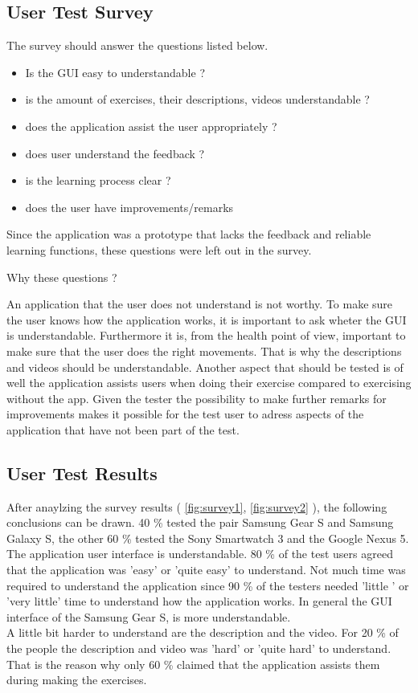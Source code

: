 \subsection{User Test Survey}
The survey should answer the questions listed below.
\begin{itemize}
\item Is the GUI easy to understandable ?
\item is the amount of exercises, their descriptions, videos understandable ?
\item does the application assist the user appropriately ?
\item does user understand the feedback ?
\item is the learning process clear ?
\item does the user have improvements/remarks
\end{itemize}
Since the application was a prototype that lacks the feedback and reliable learning functions, these questions were left out in the survey.\\
\newline
\newline
\begin{Large}
Why these questions ?\\

\end{Large}
An application that the user does not understand is not worthy. To make sure the user knows how the application works, it is important to ask wheter the GUI is understandable.
Furthermore it is, from the health point of view, important to make sure that the user does the right movements. That is why the descriptions and videos should be understandable. Another aspect that should be tested is of well the application assists users when doing their exercise compared to exercising without the app.
Given the tester the possibility to make further remarks for improvements makes it possible for the test user to adress aspects of the application that have not been part of the test.

\subsection{User Test Results}

After anaylzing the survey results ( \ref{fig:survey1}, \ref{fig:survey2} ), the following conclusions can be drawn. 40 \% tested the pair Samsung Gear S and Samsung Galaxy S, the other 60 \% tested the Sony Smartwatch 3 and the Google Nexus 5.
\\
The application user interface is understandable. 80 \% of the test users agreed that the application was 'easy' or 'quite easy' to understand. Not much time was required to understand the application since 90 \% of the testers needed 'little ' or 'very little' time to understand how the application works. In general the GUI interface of the Samsung Gear S, is more understandable.\\
A little bit harder to understand are the description and the video. For 20 \% of the people the description and video was 'hard' or 'quite hard' to understand. That is the reason why only 60 \% claimed that the application assists them during making the exercises.
